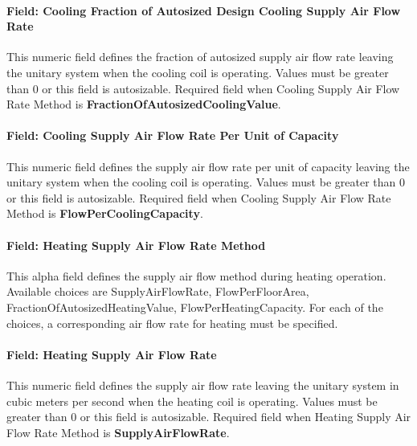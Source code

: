 \paragraph{Field: Cooling Fraction of Autosized Design Cooling Supply Air Flow Rate}\label{field-cooling-fraction-of-autosized-design-cooling-supply-air-flow-rate}

This numeric field defines the fraction of autosized supply air flow rate leaving the unitary system when the cooling coil is operating. Values must be greater than 0 or this field is autosizable. Required field when Cooling Supply Air Flow Rate Method is \textbf{FractionOfAutosizedCoolingValue}.

\paragraph{Field: Cooling Supply Air Flow Rate Per Unit of Capacity}\label{field-cooling-supply-air-flow-rate-per-unit-of-capacity}

This numeric field defines the supply air flow rate per unit of capacity leaving the unitary system when the cooling coil is operating. Values must be greater than 0 or this field is autosizable. Required field when Cooling Supply Air Flow Rate Method is \textbf{FlowPerCoolingCapacity}.

\paragraph{Field: Heating Supply Air Flow Rate Method}\label{field-heating-supply-air-flow-rate-method-000}

This alpha field defines the supply air flow method during heating operation. Available choices are SupplyAirFlowRate, FlowPerFloorArea, FractionOfAutosizedHeatingValue, FlowPerHeatingCapacity. For each of the choices, a corresponding air flow rate for heating must be specified.

\paragraph{Field: Heating Supply Air Flow Rate}\label{field-heating-supply-air-flow-rate-001}

This numeric field defines the supply air flow rate leaving the unitary system in cubic meters per second when the heating coil is operating. Values must be greater than 0 or this field is autosizable. Required field when Heating Supply Air Flow Rate Method is \textbf{SupplyAirFlowRate}.

